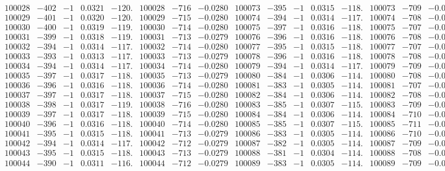 \documentclass[11pt,reqno,a4letter]{article}
\numberwithin{figure}{section}
\numberwithin{table}{section}
\theoremstyle{plain}
\numberwithin{theorem}{section}
\theoremstyle{definition}
\begin{document}
\begin{table}[ht!]
\begin{equation*}
{\begin{array}{ccccc|ccc||ccccc|ccc}
100028 & -402 & -1 & 0.0321 & -120. & 100028 & -716 & -0.0280 & 100073 & -395 & -1 & 0.0315 & -118. & 100073 & -709 & -0.0277  \\
100029 & -401 & -1 & 0.0320 & -120. & 100029 & -715 & -0.0280 & 100074 & -394 & -1 & 0.0314 & -117. & 100074 & -708 & -0.0277  \\
100030 & -400 & -1 & 0.0319 & -119. & 100030 & -714 & -0.0280 & 100075 & -397 & -1 & 0.0316 & -118. & 100075 & -707 & -0.0277  \\
100031 & -399 & -1 & 0.0318 & -119. & 100031 & -713 & -0.0279 & 100076 & -396 & -1 & 0.0316 & -118. & 100076 & -708 & -0.0277  \\
100032 & -394 & -1 & 0.0314 & -117. & 100032 & -714 & -0.0280 & 100077 & -395 & -1 & 0.0315 & -118. & 100077 & -707 & -0.0277  \\
100033 & -393 & -1 & 0.0313 & -117. & 100033 & -713 & -0.0279 & 100078 & -396 & -1 & 0.0316 & -118. & 100078 & -708 & -0.0277  \\
100034 & -394 & -1 & 0.0314 & -117. & 100034 & -714 & -0.0280 & 100079 & -394 & -1 & 0.0314 & -117. & 100079 & -709 & -0.0277  \\
100035 & -397 & -1 & 0.0317 & -118. & 100035 & -713 & -0.0279 & 100080 & -384 & -1 & 0.0306 & -114. & 100080 & -708 & -0.0277  \\
100036 & -396 & -1 & 0.0316 & -118. & 100036 & -714 & -0.0280 & 100081 & -383 & -1 & 0.0305 & -114. & 100081 & -707 & -0.0277  \\
100037 & -397 & -1 & 0.0317 & -118. & 100037 & -715 & -0.0280 & 100082 & -384 & -1 & 0.0306 & -114. & 100082 & -708 & -0.0277  \\
100038 & -398 & -1 & 0.0317 & -119. & 100038 & -716 & -0.0280 & 100083 & -385 & -1 & 0.0307 & -115. & 100083 & -709 & -0.0277  \\
100039 & -397 & -1 & 0.0317 & -118. & 100039 & -715 & -0.0280 & 100084 & -384 & -1 & 0.0306 & -114. & 100084 & -710 & -0.0278  \\
100040 & -396 & -1 & 0.0316 & -118. & 100040 & -714 & -0.0280 & 100085 & -385 & -1 & 0.0307 & -115. & 100085 & -711 & -0.0278  \\
100041 & -395 & -1 & 0.0315 & -118. & 100041 & -713 & -0.0279 & 100086 & -383 & -1 & 0.0305 & -114. & 100086 & -710 & -0.0278  \\
100042 & -394 & -1 & 0.0314 & -117. & 100042 & -712 & -0.0279 & 100087 & -382 & -1 & 0.0305 & -114. & 100087 & -709 & -0.0277  \\
100043 & -395 & -1 & 0.0315 & -118. & 100043 & -713 & -0.0279 & 100088 & -381 & -1 & 0.0304 & -114. & 100088 & -708 & -0.0277  \\
100044 & -390 & -1 & 0.0311 & -116. & 100044 & -712 & -0.0279 & 100089 & -383 & -1 & 0.0305 & -114. & 100089 & -709 & -0.0277  \\
\end{array}
}
\end{equation*} 


\end{table}
\end{document}
